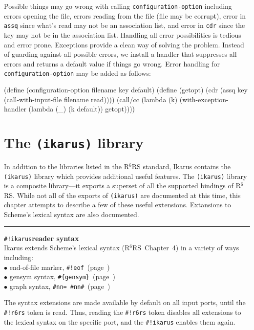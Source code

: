 \documentclass[onecolumn, 12pt, twoside, openright, dvipdfm]{book}
\makeatletter
\newcommand{\deflabelref}[2]{\texttt{#1}~(page~\pageref{#2})}
\newcommand{\rnrs}[1]{R$^{\mathrm{#1}}$RS}
\newcommand{\idxlabeldefun}[5]{
\vspace{1ex}
\rule{\textwidth}{2pt}
{\phantomsection\index{#1@\texttt{#2}}\label{#3}{\Large\texttt{#4}}\hfill\textbf{#5}}\\}
\makeatother
\begin{document}
Possible things may go wrong with calling
\texttt{configuration-option} including errors opening the file,
errors reading from the file (file may be corrupt), error in
\texttt{assq} since what's read may not be an association list, and
error in \texttt{cdr} since the key may not be in the association
list.  Handling all error possibilities is tedious and error prone.  
Exceptions provide a clean way of solving the problem.  Instead of
guarding against all possible errors, we install a handler that
suppresses all errors and returns a default value if things go
wrong.  Error handling for \texttt{configuration-option} may be
added as follows:

\begin{CodeInline}
(define (configuration-option filename key default)
  (define (getopt)
    (cdr (assq key (call-with-input-file filename read))))
  (call/cc
    (lambda (k)
      (with-exception-handler 
        (lambda (_) (k default))
        getopt))))
\end{CodeInline}


\chapter{\label{chapter:ikarus}The \texttt{(ikarus)} library}

In addition to the libraries listed in the \rnrs{6} standard, Ikarus
contains the \texttt{(ikarus)} library which provides additional
useful features.  The \texttt{(ikarus)} library is a composite
library---it exports a superset of all the supported bindings of
\rnrs{6}.  While not all of the exports of \texttt{(ikarus)} are
documented at this time, this chapter attempts to describe a few of
these useful extensions.  Extansions to Scheme's lexical syntax are
also documented.

\idxlabeldefun{\#"!ikarus}{\#"!ikarus}{shebang-ikarus}{\#!ikarus}{reader syntax}

Ikarus extends Scheme's lexical syntax (\rnrs{6}~Chapter~4) in a
variety of ways including:\\
$\bullet$ end-of-file marker, \deflabelref{\#!eof}{shebang-eof}\\
$\bullet$ gensym syntax, \deflabelref{\#\{gensym\}}{gensym syntax}\\
$\bullet$ graph syntax, \deflabelref{\#nn= \#nn\#}{graph-syntax}

The syntax extensions are made available by default on all input
ports, until the \texttt{\#!r6rs} token is read.  Thus, reading the
\texttt{\#!r6rs} token disables all extensions to the lexical syntax
on the specific port, and the \texttt{\#!ikarus} enables them again.
\end{document}
